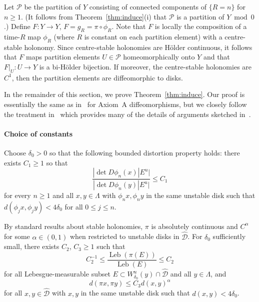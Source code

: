 \documentclass[12pt]{article}
\numberwithin{equation}{section}
\newcommand{\cP}{{\mathcal P}}
\newcommand{\hcD}{{\widehat {\mathcal D}}}
\newcommand{\Leb}{\operatorname{Leb}}
\begin{document}
\begin{rmk} \label{rmk:induce}
Let $\cP$ be the partition of $Y$ consisting of connected components of $\{R=n\}$ for $n\ge1$. (It follows from Theorem~\ref{thm:induce}(i) that $\cP$ is a partition of $Y\bmod0$.) Define $F:Y\to Y$, $F=g_R=\pi\circ \phi_R$.
Note that $F$ is locally the composition of a time-$R$ map $\phi_R$ (where $R$ is constant on each partition element) with a centre-stable holonomy.
Since centre-stable holonomies are H\"older continuous,
it follows that $F$ maps partition elements $U\in\cP$ homeomorphically onto $Y$ 
and that $F|_U:U\to Y$ is a bi-H\"older bijection.
If moreover, the centre-stable holonomies are $C^1$, then the partition elements are diffeomorphic to disks.
\end{rmk}


In the remainder of this section, we prove Theorem~\ref{thm:induce}.
Our proof is essentially the same as in~\cite[Section~6]{Young98} for Axiom~A diffeomorphisms, but we closely follow the treatment in~\cite{AlvesLuzzattoPinheiro05} which provides many of the details of arguments sketched in~\cite{Young98}.

\paragraph{Choice of constants}
Choose $\delta_0>0$ so that 
the following
bounded distortion property holds: there exists $C_1\ge1$ so that
\begin{equation}\label{eq:bdd}
\frac{|\det D\phi_n(x)|E^u|}{|\det D\phi_n(y)|E^u|} \leq C_1
\end{equation}
for every $n\ge 1$ and all $x,y\in \Lambda$ with $\phi_nx,\phi_ny$ in the same unstable disk such that $d(\phi_jx,\phi_jy)<4\delta_0$ for all $0\le j \le n$. 

By standard results about stable holonomies, $\pi$ is absolutely continuous and $C^\alpha$ for some $\alpha\in(0,1)$ when restricted to unstable disks in $\hcD$.
For $\delta_0$ sufficiently small, there exists $C_2$, $C_3\ge1$ such that
\begin{equation}\label{eq:bddpi}
C_2^{-1}\le \frac{\Leb(\pi(E))}{\Leb(E)} \leq C_2
\end{equation}
for all Lebesgue-measurable subset $E\subset W^u_{\delta_0}(y)\cap\hcD$ and all $y\in\Lambda$,
and
\begin{equation} \label{eq:C2}
d(\pi x,\pi y)\le C_3 d(x,y)^\alpha
\end{equation}
for all $x,y\in \hcD$ with $x,y$ in the same unstable disk such that $d(x,y)<4\delta_0$.
\end{document}
